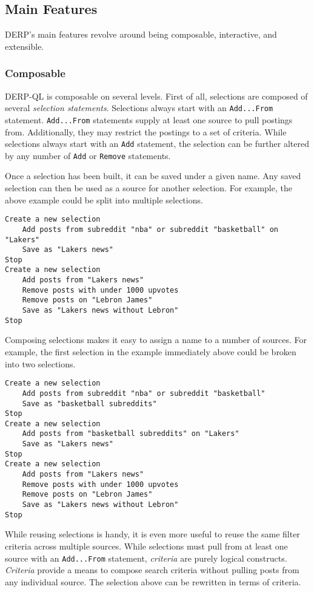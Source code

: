 \subsection{Main Features}
DERP's main features revolve around being composable, interactive, and extensible. 
\subsubsection{Composable}
\label{subsub:Composable}
DERP-QL is composable on several levels. First of all, selections are composed of several \textit{selection statements}.
Selections always start with an \texttt{Add...From} statement. \texttt{Add...From} statements supply at least one source to pull postings from. Additionally, they may restrict the postings to a set of criteria. While selections always start with an \texttt{Add} statement, the selection can be further altered by any number of \texttt{Add} or \texttt{Remove} statements. 

Once a selection has been built, it can be saved under a given name. Any saved selection can then be used as a source for another selection. For example, the above example could be split into multiple selections.

\begin{lstlisting}
Create a new selection
    Add posts from subreddit "nba" or subreddit "basketball" on "Lakers"
    Save as "Lakers news"
Stop
Create a new selection
    Add posts from "Lakers news"
    Remove posts with under 1000 upvotes
    Remove posts on "Lebron James"
    Save as "Lakers news without Lebron"
Stop
\end{lstlisting}

Composing selections makes it easy to assign a name to a number of sources. For example, the first selection in the example immediately above could be broken into two selections.

\begin{lstlisting}
Create a new selection
    Add posts from subreddit "nba" or subreddit "basketball" 
    Save as "basketball subreddits"
Stop
Create a new selection
    Add posts from "basketball subreddits" on "Lakers"
    Save as "Lakers news"
Stop
Create a new selection
    Add posts from "Lakers news"
    Remove posts with under 1000 upvotes
    Remove posts on "Lebron James"
    Save as "Lakers news without Lebron"
Stop
\end{lstlisting}

While reusing selections is handy, it is even more useful to reuse the same filter criteria across multiple sources.
While selections must pull from at least one source with an \texttt{Add...From} statement, \textit{criteria}\label{create:criteria} are purely logical constructs. \textit{Criteria} provide a means to compose search criteria without pulling posts from any individual source. The selection above can be rewritten in terms of criteria.

